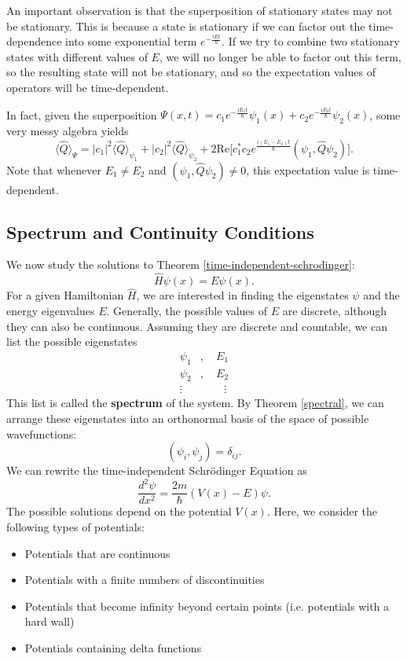 \begin{framedrmk*}
    An important observation is that the superposition of stationary states may not be stationary. This is because a state is stationary if we can factor out the time-dependence into some exponential term $e^{-\frac{iEt}{\hbar}}$. If we try to combine two stationary states with different values of $E$, we will no longer be able to factor out this term, so the resulting state will not be stationary, and so the expectation values of operators will be time-dependent. 

    In fact, given the superposition $\Psi(x,t)=c_1e^{-\frac{iE_1t}{\hbar}}\psi_1(x)+c_2e^{-\frac{iE_2t}{\hbar}}\psi_2(x)$, some very messy algebra yields $$\langle\hat{Q}\rangle_\Psi=|c_1|^2\langle\hat{Q}\rangle_{\psi_1}+|c_2|^2\langle\hat{Q}\rangle_{\psi_2}+2\text{Re}\bigg[c_1^*c_2e^{\frac{i(E_1-E_2)t}{\hbar}}(\psi_1,\hat{Q}\psi_2)\bigg].$$ Note that whenever $E_1\neq E_2$ and $(\psi_1,\hat{Q}\psi_2)\neq 0$, this expectation value is time-dependent.
\end{framedrmk*} 

\subsection{Spectrum and Continuity Conditions}\label{spectrum_continuity_conditions}

We now study the solutions to Theorem \ref{time-independent-schrodinger}: $$\hat{H}\psi(x)=E\psi(x).$$For a given Hamiltonian $\hat{H}$, we are interested in finding the eigenstates $\psi$ and the energy eigenvalues $E$. Generally, the possible values of $E$ are discrete, although they can also be continuous. Assuming they are discrete and countable, we can list the possible eigenstates \begin{align*}\psi_1&,\quad E_1\\\psi_2&,\quad E_2\\\vdots\ &\qquad\,\vdots\end{align*}This list is called the \textbf{spectrum} of the system. By Theorem \ref{spectral}, we can arrange these eigenstates into an orthonormal basis of the space of possible wavefunctions: $$(\psi_i,\psi_j)=\delta_{ij}.$$We can rewrite the time-independent Schrödinger Equation as $$\frac{d^2\psi}{dx^2}=\frac{2m}{\hbar}(V(x)-E)\psi.$$The possible solutions depend on the potential $V(x)$. Here, we consider the following types of potentials: 

\begin{itemize}
    \item Potentials that are continuous
    \item Potentials with a finite numbers of discontinuities
    \item Potentials that become infinity beyond certain points (i.e. potentials with a hard wall)
    \item Potentials containing delta functions
\end{itemize}


